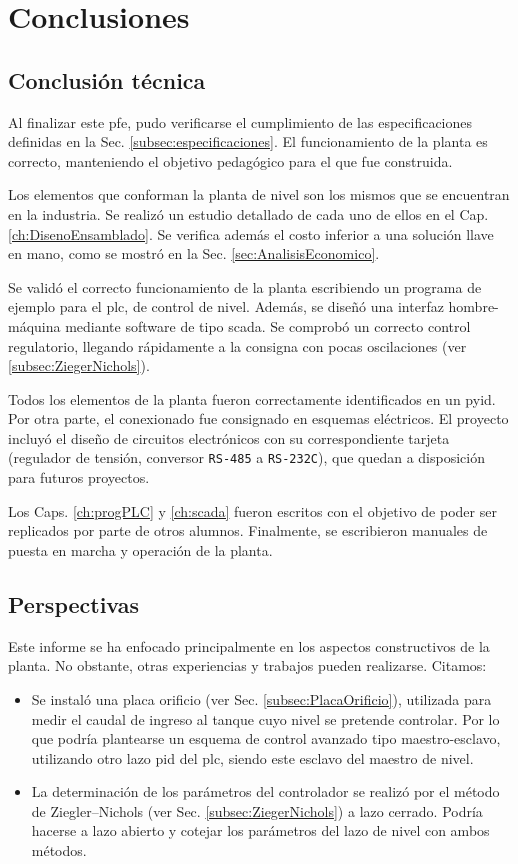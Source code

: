 \chapter{Conclusiones}
\label{ch:conclusiones}

\section{Conclusión técnica}
\label{sec:ConclusionTecnica}

Al finalizar este \gls{pfe}, pudo verificarse el cumplimiento de las
especificaciones definidas en la Sec. \ref{subsec:especificaciones}.
El funcionamiento de la planta es correcto, manteniendo el objetivo pedagógico
para el que fue construida.

Los elementos que conforman la planta de nivel son los mismos que se
encuentran en la industria.
Se realizó un estudio detallado de cada uno de ellos en el Cap.
\ref{ch:DisenoEnsamblado}.
Se verifica además el costo inferior a una solución llave en mano, como se
mostró en la Sec. \ref{sec:AnalisisEconomico}.

Se validó el correcto funcionamiento de la planta escribiendo un programa de
ejemplo para el \gls{plc}, de control de nivel.
Además, se diseñó una interfaz hombre-máquina mediante software de tipo
\gls{scada}.
Se comprobó un correcto control regulatorio, llegando rápidamente a la consigna
con pocas oscilaciones (ver \ref{subsec:ZiegerNichols}).

Todos los elementos de la planta fueron correctamente identificados en un
\gls{pyid}.
Por otra parte, el conexionado fue consignado en esquemas eléctricos.
El proyecto incluyó el diseño de circuitos electrónicos con su correspondiente
tarjeta (regulador de tensión, conversor \verb|RS-485| a \verb|RS-232C|), que
quedan a disposición para futuros proyectos.

Los Caps. \ref{ch:progPLC} y \ref{ch:scada} fueron escritos con el
objetivo de poder ser replicados por parte de otros alumnos.
Finalmente, se escribieron manuales de puesta en marcha y operación de la
planta.

\section{Perspectivas}
\label{sec:Perspectivas}
Este informe se ha enfocado principalmente en los aspectos constructivos
de la planta.
No obstante, otras experiencias y trabajos pueden realizarse. Citamos:
\begin{itemize}
\item Se instaló una placa orificio (ver Sec. \ref{subsec:PlacaOrificio}), 
utilizada
para medir el caudal de ingreso al tanque cuyo nivel se pretende controlar. Por 
lo que podría plantearse un esquema de control avanzado tipo maestro-esclavo, 
utilizando otro lazo \gls{pid} del \gls{plc}, siendo este esclavo del maestro
de nivel.
\item La determinación de los parámetros del controlador se realizó por 
el método de Ziegler–Nichols (ver Sec. \ref{subsec:ZiegerNichols}) a lazo
cerrado.
Podría hacerse a lazo abierto y cotejar los parámetros del lazo de
nivel con ambos métodos.
\end{itemize}

